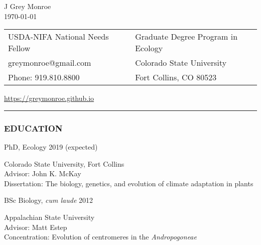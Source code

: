 \documentclass[12pt,english]{article}
\providecommand{\tabularnewline}{\\}
\begin{document}
\begin {center}
{\huge J Grey Monroe}\tabularnewline
\today

\vspace{1em}

\begin{tabular}{>{\raggedright}p{3in}>{\raggedleft}p{3in}}
USDA-NIFA National Needs Fellow & Graduate Degree Program in Ecology\tabularnewline
 greymonroe@gmail.com &  Colorado State University \tabularnewline
Phone: 919.810.8800 & Fort Collins, CO 80523\tabularnewline
\end{tabular}
\href{https://greymonroe.github.io}{https://greymonroe.github.io}
\end{center}
\vspace{-1em}

\rule[0.5ex]{1\columnwidth}{0.5pt}


\subsubsection*{EDUCATION}
\vspace{-0.5ex}

\hspace{1.0em} PhD, Ecology
\hfill
2019 (expected)
\par
\hspace*{2.0em} Colorado State University, Fort Collins \\
\hspace*{2.0em} Advisor: John K. McKay \\
\hspace*{2.0em} Dissertation: The biology, genetics, and evolution of climate adaptation in plants
\\
\vspace{-0.5ex}\par

\hspace{1.0em} BSc Biology, \emph{cum laude}
\hfill
2012
\par
\hspace*{2.0em} Appalachian State University \\
\hspace*{2.0em} Advisor: Matt Estep \\
\hspace*{2.0em} Concentration: Evolution of centromeres in the \textit{Andropogoneae} \\
\end{document}
